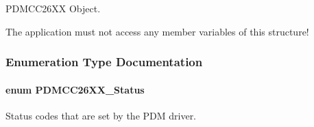 P\+D\+M\+C\+C26\+X\+X Object. 

The application must not access any member variables of this structure! 

\subsubsection{Enumeration Type Documentation}
\paragraph[{P\+D\+M\+C\+C26\+X\+X\+\_\+\+Status}]{\setlength{\rightskip}{0pt plus 5cm}enum {\bf P\+D\+M\+C\+C26\+X\+X\+\_\+\+Status}}\label{_p_d_m_c_c26_x_x_8h_afbfe993e790be75708df00186070a779}


Status codes that are set by the P\+D\+M driver. 

